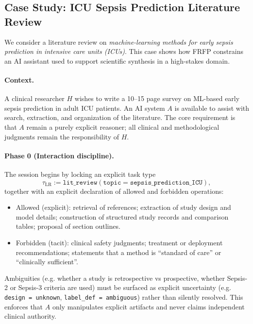 \subsection{Case Study: ICU Sepsis Prediction Literature Review}
\label{sec:case-sepsis}

We consider a literature review on \emph{machine-learning methods for early sepsis prediction in intensive care units (ICUs)}. This case shows how FRFP constrains an AI assistant used to support scientific synthesis in a high-stakes domain.

\paragraph{Context.}
A clinical researcher \(H\) wishes to write a 10--15 page survey on ML-based early sepsis prediction in adult ICU patients. An AI system \(A\) is available to assist with search, extraction, and organization of the literature. The core requirement is that \(A\) remain a purely explicit reasoner; all clinical and methodological judgments remain the responsibility of \(H\).

\paragraph{Phase 0 (Interaction discipline).}
The session begins by locking an explicit task type
\[
  \tau_{\mathrm{LR}} := \texttt{lit\_review}(\texttt{topic} = \texttt{sepsis\_prediction\_ICU}),
\]
together with an explicit declaration of allowed and forbidden operations:
\begin{itemize}
  \item Allowed (explicit): retrieval of references; extraction of study design and model details; construction of structured study records and comparison tables; proposal of section outlines.
  \item Forbidden (tacit): clinical safety judgments; treatment or deployment recommendations; statements that a method is ``standard of care'' or ``clinically sufficient''.
\end{itemize}
Ambiguities (e.g. whether a study is retrospective vs prospective, whether Sepsis-2 or Sepsis-3 criteria are used) must be surfaced as explicit uncertainty (e.g. \verb|design = unknown|, \verb|label_def = ambiguous|) rather than silently resolved. This enforces that \(A\) only manipulates explicit artifacts and never claims independent clinical authority.

